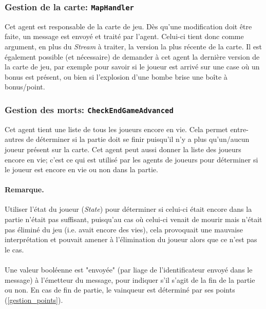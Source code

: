 \documentclass{article}
\begin{document}
\subsubsection{Gestion de la carte: \texttt{MapHandler}}
\label{gestion_map}
Cet agent est responsable de la carte de jeu. Dès qu'une modification doit être faite, un message est envoyé et traité par l'agent. Celui-ci tient donc comme argument, en plus du \emph{Stream} à traiter, la version la plus récente de la carte. Il est également possible (et nécessaire) de demander à cet agent la dernière version de la carte de jeu, par exemple pour savoir si le joueur est arrivé sur une case où un bonus est présent, ou bien si l'explosion d'une bombe brise une boîte à bonus/point.
\subsubsection{Gestion des morts: \texttt{CheckEndGameAdvanced}}
\label{gestion_morts}
Cet agent tient une liste de tous les joueurs encore en vie. Cela permet entre-autres de déterminer si la partie doit se finir puisqu'il n'y a plus qu'un/aucun joueur présent sur la carte. Cet agent peut aussi donner la liste des joueurs encore en vie; c'est ce qui est utilisé par les agents de joueurs pour déterminer si le joueur est encore en vie ou non dans la partie.
\paragraph{Remarque.}Utiliser l'état du joueur (\emph{State}) pour déterminer si celui-ci était encore dans la partie n'était pas suffisant, puisqu'au cas où celui-ci venait de mourir mais n'était pas éliminé du jeu (i.e. avait encore des vies), cela provoquait une mauvaise interprétation et pouvait amener à l'élimination du joueur alors que ce n'est pas le cas.\\ \\
Une valeur booléenne est "envoyée" (par liage de l'identificateur envoyé dans le message) à l'émetteur du message, pour indiquer s'il s'agit de la fin de la partie ou non. En cas de fin de partie, le vainqueur est déterminé par ses points (\ref{gestion_points}).
\end{document}
